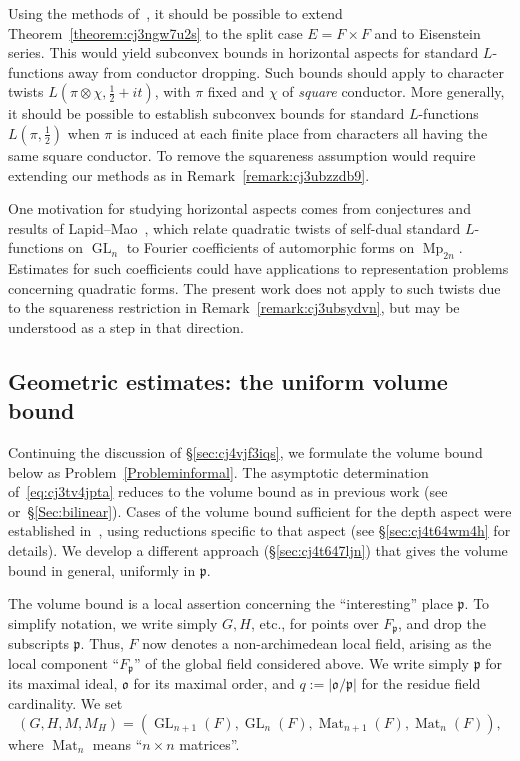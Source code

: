 \documentclass[reqno]{amsart}
\DeclareMathOperator{\Mp}{Mp}
\DeclareMathOperator{\Mat}{Mat}
\DeclareMathOperator{\GL}{GL}
\theoremstyle{plain} \newtheorem{theorem} {Theorem} \newtheorem{conjecture} {Conjecture} \newtheorem{corollary} [theorem] {Corollary} \newtheorem{proposition} [theorem] {Proposition} \newtheorem{fact} [theorem] {Fact}
\theoremstyle{definition} \newtheorem{definition} [theorem] {Definition}
\theoremstyle{itplain} %
\begin{document}
\begin{remark}\label{remark:cj3ubsydvn}
  Using the methods of~\cite{2021arXiv210915230N}, it should be possible to extend Theorem~\ref{theorem:cj3ngw7u2s} to the split case $E = F \times F$ and to Eisenstein series.  This would yield subconvex bounds in horizontal aspects for standard $L$-functions away from conductor dropping.  Such bounds should apply to character twists $L(\pi \otimes \chi, \tfrac{1}{2} + i t)$, with $\pi$ fixed and $\chi$ of \emph{square} conductor.  More generally, it should be possible to establish subconvex bounds for standard $L$-functions $L(\pi,\tfrac{1}{2})$ when $\pi$ is induced at each finite place from characters all having the same square conductor.  To remove the squareness assumption would require extending our methods as in Remark~\ref{remark:cj3ubzzdb9}.
\end{remark}
\begin{remark}\label{remark:cj3u905a9t}
  One motivation for studying horizontal aspects comes from conjectures and results of Lapid--Mao~\cite{MR3267120, MR3619910, MR3649366}, which relate quadratic twists of self-dual standard $L$-functions on $\GL_n$ to Fourier coefficients of automorphic forms on $\Mp_{2n}$.  Estimates for such coefficients could have applications to representation problems concerning quadratic forms.  The present work does not apply to such twists due to the squareness restriction in Remark~\ref{remark:cj3ubsydvn}, but may be understood as a step in that direction.
\end{remark}


\subsection{Geometric estimates: the uniform volume bound}\label{sec:cj3ubuyr8u}
Continuing the discussion of \S\ref{sec:cj4vjf3iqs}, we formulate the volume bound below as Problem~\ref{Probleminformal}.  The asymptotic determination of~\eqref{eq:cj3tv4jpta} reduces to the volume bound as in previous work (see~\cite[\S1.5.3]{2020arXiv201202187N} or~\S\ref{Sec:bilinear}).  Cases of the volume bound sufficient for the depth aspect were established in~\cite{2020arXiv201202187N}, using reductions specific to that aspect (see \S\ref{sec:cj4t64wm4h} for details).  We develop a different approach (\S\ref{sec:cj4t647ljn}) that gives the volume bound in general, uniformly in $\mathfrak{p}$.

The volume bound is a local assertion concerning the ``interesting'' place $\mathfrak{p}$.  To simplify notation, we write simply $G, H$, etc., for points over $F_\mathfrak{p}$, and drop the subscripts $\mathfrak{p}$.  Thus, $F$ now denotes a non-archimedean local field, arising as the local component ``$F_\mathfrak{p}$'' of the global field considered above.  We write simply $\mathfrak{p}$ for its maximal ideal, $\mathfrak{o}$ for its maximal order, and $q := \left\lvert \mathfrak{o} / \mathfrak{p} \right\rvert$ for the residue field cardinality.  We set
\begin{equation*}
(G,H,M, M_H) = (\GL_{n+1}(F), \GL_n(F), \Mat_{n+1}(F), \Mat_n(F)),
\end{equation*}
where $\Mat_n$ means ``$n \times n$ matrices''.
\end{document}
